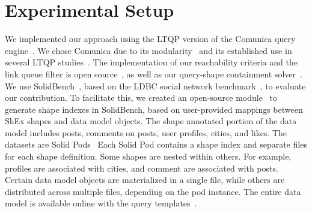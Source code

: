 \section{Experimental Setup}






We implemented our approach using the LTQP version of the Comunica query engine~\cite{taelman_iswc_resources_comunica_2018}.
We chose Comunica due to its modularity~\cite{taelman_swj_componentsjs_2022} and its established use in several LTQP studies~\cite{Bogaerts2021LinkTW, Taelman2023, eschauzier_quweda_linkqueue_2023, Hanski2024, eschauzier_amw_rcubemetric_2024, tam2024opportunitiesshapebasedoptimizationlink}.
The implementation of our reachability criteria and the link queue filter is open source~, as well as our query-shape containment solver~.
We use SolidBench~\cite{Taelman2023}, based on the LDBC social network benchmark~\cite{Angles2020}, to evaluate our contribution. 
To facilitate this, we created an open-source module~ to generate shape indexes in SolidBench, based on user-provided mappings between ShEx shapes and data model objects.
The shape annotated portion of the data model includes posts, comments on posts, user profiles, cities, and likes.
The datasets are Solid Pods~\cite{Taelman2023}
Each Solid Pod contains a shape index and separate files for each shape definition.
Some shapes are nested within others. 
For example, profiles are associated with cities, and comment are associated with posts.
Certain data model objects are materialized in a single file, while others are distributed across multiple files, depending on the pod instance.
The entire data model is available online with the query templates~.

